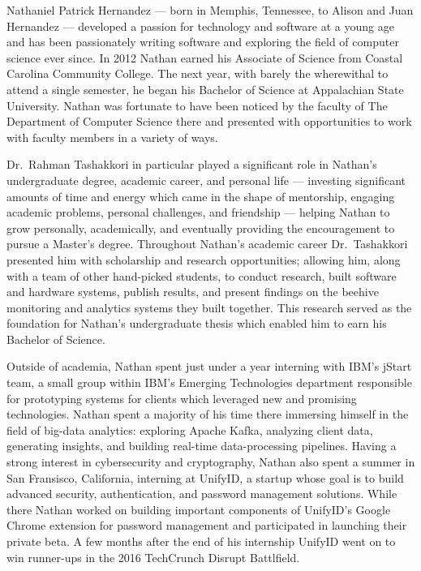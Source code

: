 \biography{}

Nathaniel Patrick Hernandez --- born in Memphis, Tennessee, to Alison and Juan
Hernandez --- developed a passion for technology and software at a young age
and has been passionately writing software and exploring the field of computer
science ever since. In 2012 Nathan earned his Associate of Science from Coastal
Carolina Community College. The next year, with barely the wherewithal to
attend a single semester, he began his Bachelor of Science at Appalachian State
University. Nathan was fortunate to have been noticed by the faculty of The
Department of Computer Science there and presented with opportunities to work
with faculty members in a variety of ways.

Dr.~Rahman Tashakkori in particular played a significant role in Nathan's
undergraduate degree, academic career, and personal life --- investing
significant amounts of time and energy which came in the shape of mentorship,
engaging academic problems, personal challenges, and friendship --- helping
Nathan to grow personally, academically, and eventually providing the
encouragement to pursue a Master's degree. Throughout Nathan's academic career
Dr.~Tashakkori presented him with scholarship and research opportunities;
allowing him, along with a team of other hand-picked students, to conduct
research, built software and hardware systems, publish results, and present
findings on the beehive monitoring and analytics systems they built together.
This research served as the foundation for Nathan's undergraduate thesis which
enabled him to earn his Bachelor of Science.

Outside of academia, Nathan spent just under a year interning with IBM's jStart
team, a small group within IBM's Emerging Technologies department responsible
for prototyping systems for clients which leveraged new and promising
technologies. Nathan spent a majority of his time there immersing himself in
the field of big-data analytics: exploring Apache Kafka, analyzing client data,
generating insights, and building real-time data-processing pipelines. Having a
strong interest in cybersecurity and cryptography, Nathan also spent a summer
in San Fransisco, California, interning at UnifyID, a startup whose goal is to
build advanced security, authentication, and password management solutions.
While there Nathan worked on building important components of UnifyID's Google
Chrome extension for password management and participated in launching their
private beta. A few months after the end of his internship UnifyID went on to
win runner-ups in the 2016 TechCrunch Disrupt Battlfield.

